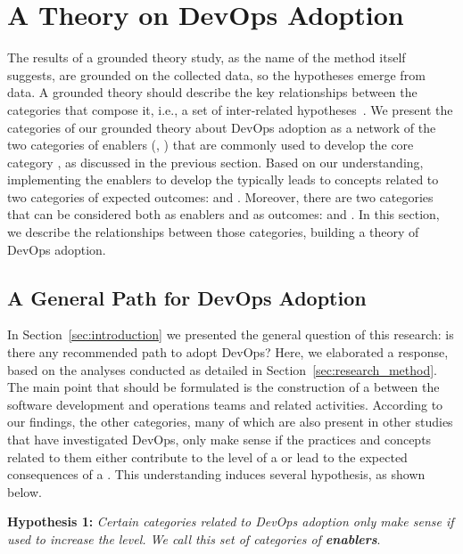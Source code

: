 \section{A Theory on DevOps Adoption} \label{sec:results}

The results of a grounded theory study, as the name of the method itself
suggests, are grounded on the collected data, so the hypotheses emerge from
data. A grounded theory should describe the key relationships between the
categories that compose it, i.e., a set of inter-related hypotheses~\cite{hoda2017becoming}.
We present the categories of our grounded theory
about DevOps adoption as a network of the two categories of enablers (,
) that are commonly used to develop the core category
\cc, as discussed in the previous section. Based on our understanding,
implementing the enablers to develop the \cc typically leads
to concepts related to two categories of expected outcomes:
 and . Moreover, there are two categories that can be considered
both as enablers and as outcomes:  and .
In this section, we describe the relationships between those categories, building a theory
of DevOps adoption.

\subsection{A General Path for DevOps Adoption}

In Section~\ref{sec:introduction} we presented the general question of this
research: is there any recommended path to adopt DevOps? Here, we elaborated a response,
based on the analyses conducted as detailed in Section~\ref{sec:research_method}. The main
point that should be formulated is the construction of a  between the software development and operations teams and
related activities. According to our findings, the other categories,
many of which are also present in other studies that have investigated DevOps,
only make sense if the practices and
concepts related to them either contribute to the level of a \cc or lead to the expected consequences
of a \cc. This understanding induces several hypothesis, as shown below.

\begin{mh}
\textbf{Hypothesis 1:} \textit{Certain categories related to DevOps adoption
only make sense if used to increase the} \cc \emph{level. We
call this set of categories of \textbf{enablers}}.
\end{mh}

